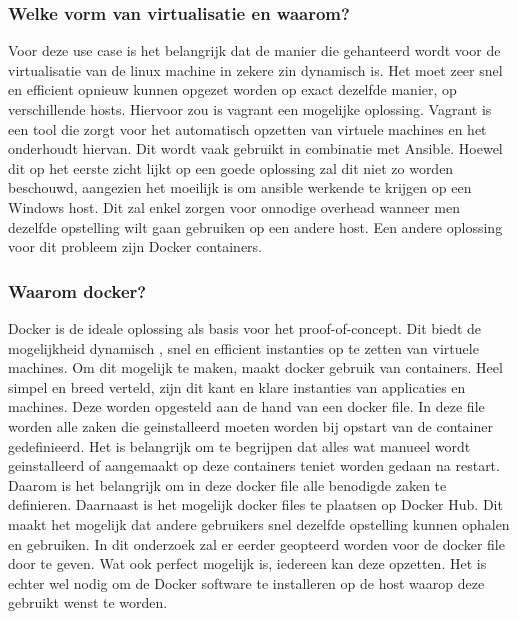 \subsubsection{Welke vorm van virtualisatie en waarom?}
Voor deze use case is het belangrijk dat de manier die gehanteerd wordt voor de virtualisatie van de linux machine in zekere zin dynamisch is. Het moet zeer snel en efficient opnieuw kunnen opgezet worden op exact dezelfde manier, op verschillende hosts. Hiervoor zou is vagrant een mogelijke oplossing. Vagrant is een tool die zorgt voor het automatisch opzetten van virtuele machines en het onderhoudt hiervan. \autocite{samandal2021} Dit wordt vaak gebruikt in combinatie met Ansible. Hoewel dit op het eerste zicht lijkt op een goede oplossing zal dit niet zo worden beschouwd, aangezien het moeilijk is om ansible werkende te krijgen op een Windows host. Dit zal enkel zorgen voor onnodige overhead wanneer men dezelfde opstelling wilt gaan gebruiken op een andere host. Een andere oplossing voor dit probleem zijn Docker containers. 

\subsubsection{Waarom docker?}
Docker is de ideale oplossing als basis voor het proof-of-concept. Dit biedt de mogelijkheid dynamisch , snel en efficient instanties op te zetten van virtuele machines. Om dit mogelijk te maken, maakt docker gebruik van containers. Heel simpel en breed verteld, zijn dit kant en klare instanties van applicaties en machines. Deze worden opgesteld aan de hand van een docker file. In deze file worden alle zaken die geinstalleerd moeten worden bij opstart van de container gedefinieerd. Het is belangrijk om te begrijpen dat alles wat manueel wordt geinstalleerd of aangemaakt op deze containers teniet worden gedaan na restart. Daarom is het belangrijk om in deze docker file alle benodigde zaken te definieren. Daarnaast is het mogelijk  docker files te plaatsen op Docker Hub. Dit maakt het mogelijk dat andere gebruikers snel dezelfde opstelling kunnen ophalen en gebruiken. In dit onderzoek zal er eerder geopteerd worden voor de docker file door te geven. Wat ook perfect mogelijk is, iedereen kan deze opzetten. Het is echter wel nodig om de Docker software te installeren op de host waarop deze gebruikt wenst te worden. \autocite{Docker} 






